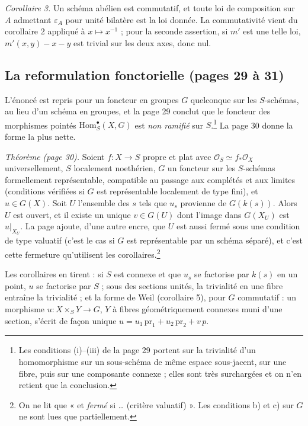 \documentclass[11pt,a4paper]{article}
\begin{document}
\emph{Corollaire 3.} Un schéma abélien est commutatif, et toute loi de
composition sur $A$ admettant $\varepsilon_A$ pour unité bilatère est la loi
donnée. La commutativité vient du corollaire 2 appliqué à $x \mapsto x^{-1}$ ;
pour la seconde assertion, si $m'$ est une telle loi,
$m'(x, y) - x - y$ est trivial sur les deux axes, donc nul.

\subsection*{La reformulation fonctorielle (pages 29 à 31)}

L'énoncé est repris pour un foncteur en groupes $G$ quelconque sur les
$S$-schémas, au lieu d'un schéma en groupes, et la page 29 conclut que le
foncteur des morphismes pointés $\mathrm{Hom}^\bullet_S(X, G)$ est \emph{non
ramifié} sur $S$.\footnote{Les conditions (i)--(iii) de la page 29 portent sur
la trivialité d'un homomorphisme sur un sous-schéma de même espace sous-jacent,
sur une fibre, puis sur une composante connexe ; elles sont très surchargées et
on n'en retient que la conclusion.} La page 30 donne la forme la plus nette.

\emph{Théorème (page 30).} Soient $f \colon X \to S$ propre et plat avec
$\mathcal{O}_S \simeq f_*\mathcal{O}_X$ universellement, $S$ localement
noethérien, $G$ un foncteur sur les $S$-schémas formellement représentable,
compatible au passage aux complétés et aux limites (conditions vérifiées si
$G$ est représentable localement de type fini), et $u \in G(X)$. Soit $U$
l'ensemble des $s$ tels que $u_s$ provienne de $G(k(s))$. Alors $U$ est ouvert,
et il existe un unique $v \in G(U)$ dont l'image dans $G(X_U)$ est
$u|_{X_U}$. La page ajoute, d'une autre encre, que $U$ est aussi fermé sous
une condition de type valuatif (c'est le cas si $G$ est représentable par un
schéma séparé), et c'est cette fermeture qu'utilisent les corollaires.\footnote{On
ne lit que « et \emph{fermé} si … (critère valuatif) ». Les conditions b) et c)
sur $G$ ne sont lues que partiellement.}

Les corollaires en tirent : si $S$ est connexe et que $u_s$ se factorise par
$k(s)$ en un point, $u$ se factorise par $S$ ; sous des sections unités, la
trivialité en une fibre entraîne la trivialité ; et la forme de Weil
(corollaire 5), pour $G$ commutatif : un morphisme $u \colon X \times_S Y \to G$, $Y$ à fibres
géométriquement connexes muni d'une section, s'écrit de façon unique
$u = u_1\,\mathrm{pr}_1 + u_2\,\mathrm{pr}_2 + v\,p$.
\end{document}
